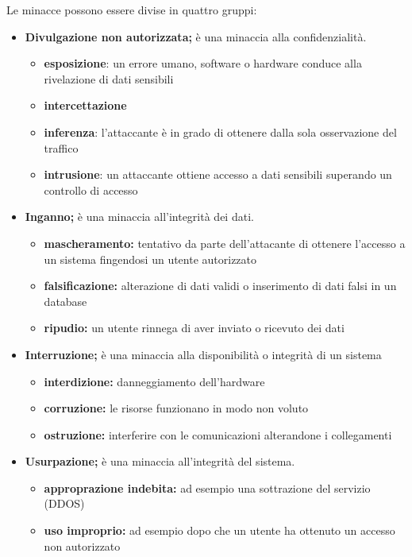 Le minacce possono essere divise in quattro gruppi:
\begin{itemize}
    \item \textbf{Divulgazione non autorizzata;} è una minaccia alla confidenzialità.
    \begin{itemize}
        \item \textbf{esposizione}: un errore umano, software o hardware conduce alla rivelazione di dati sensibili
        \item \textbf{intercettazione}
        \item \textbf{inferenza}: l'attaccante è in grado di ottenere dalla sola osservazione del traffico
        \item \textbf{intrusione}: un attaccante ottiene accesso a dati sensibili superando un controllo di accesso
    \end{itemize}
    \item \textbf{Inganno;} è una minaccia all'integrità dei dati.
    \begin{itemize}
        \item \textbf{mascheramento:} tentativo da parte dell'attacante di ottenere l'accesso a un sistema fingendosi un utente autorizzato
        \item \textbf{falsificazione:} alterazione di dati validi o inserimento di dati falsi in un database
        \item \textbf{ripudio:} un utente rinnega di aver inviato o ricevuto dei dati
    \end{itemize}
    \item \textbf{Interruzione;} è una minaccia alla disponibilità o integrità di un sistema
    \begin{itemize}
        \item \textbf{interdizione:} danneggiamento dell'hardware
        \item \textbf{corruzione:} le risorse funzionano in modo non voluto
        \item \textbf{ostruzione:} interferire con le comunicazioni alterandone i collegamenti
    \end{itemize}
    \item \textbf{Usurpazione;} è una minaccia all'integrità del sistema.
    \begin{itemize}
        \item \textbf{approprazione indebita:} ad esempio una sottrazione del servizio (DDOS)
        \item \textbf{uso improprio:} ad esempio dopo che un utente ha ottenuto un accesso non autorizzato  
    \end{itemize}
\end{itemize}

